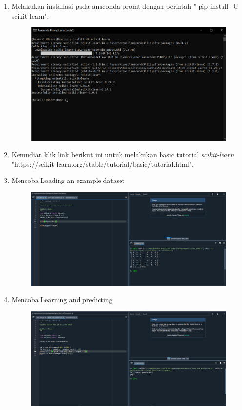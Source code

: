 \begin{enumerate}
\item Melakukan installasi pada anaconda promt dengan perintah " pip install -U scikit-learn".
\begin{figure}[!htbp]
	\centering
	\includegraphics[scale=0.4]{figures/pipinstall.PNG}
\end{figure}
\newpage
\item Kemudian klik link berikut ini untuk melakukan basic tutorial \textit{scikit-learn} "https://scikit-learn.org/stable/tutorial/basic/tutorial.html".
\item
Mencoba Loading an example dataset
\begin{figure}[!htbp]
	\centering
	\includegraphics[scale=0.4]{figures/loaddataset.PNG}
\end{figure}
\item
Mencoba Learning and predicting
\begin{figure}[!htbp]
	\centering
	\includegraphics[scale=0.4]{figures/learnpredict.PNG}

\end{figure}
\end{enumerate}
